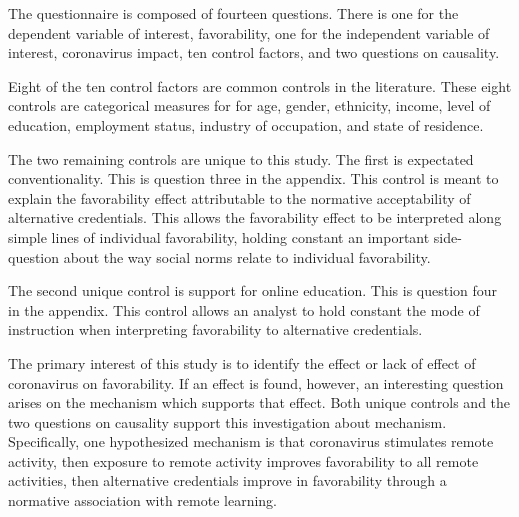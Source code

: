 \documentclass[review]{elsarticle}
\begin{document}
The questionnaire is composed of fourteen questions.
There is one for the dependent variable of interest, favorability,
one for the independent variable of interest, coronavirus impact,
ten control factors,
and two questions on causality.

Eight of the ten control factors are common controls in the literature.
These eight controls are categorical measures for
for age, gender, ethnicity, income,
level of education, employment status, industry of occupation, and state of residence.

The two remaining controls are unique to this study.
The first is expectated conventionality.
This is question three in the appendix.
This control is meant to explain the favorability effect attributable to the normative acceptability of alternative credentials.
This allows the favorability effect to be interpreted along simple lines of individual favorability,
holding constant an important side-question about the way social norms relate to individual favorability.

The second unique control is support for online education.
This is question four in the appendix.
This control allows an analyst to hold constant the mode of instruction when interpreting favorability to alternative credentials.

The primary interest of this study is to identify the effect or lack of effect of coronavirus on favorability.
If an effect is found, however, an interesting question arises on the mechanism which supports that effect.
Both unique controls and the two questions on causality support this investigation about mechanism.
Specifically, one hypothesized mechanism is that coronavirus stimulates remote activity,
then exposure to remote activity improves favorability to all remote activities,
then alternative credentials improve in favorability through a normative association with remote learning.
\end{document}
